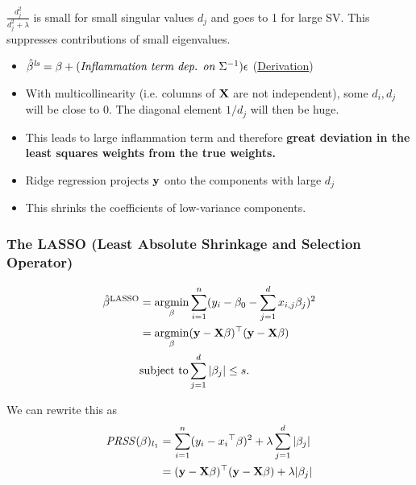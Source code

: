 $\frac{d_j^2}{d_j^2 + \lambda}$ is small for small singular values $d_j$ and goes to 1 for large SV. This suppresses contributions of small eigenvalues.
\begin{itemize}
	\item $\hat \beta^\textit{ls} = \beta + (\textit{Inflammation term dep. on ${\Sigma}^{-1}$}) \epsilon$ (\href{https://kunyu-he.com/2020/01/11/SVD-in-Machine-Learning-Ridge-Regression-and-Multicollinearity/}{Derivation})
	\item With multicollinearity (i.e. columns of $\mathbf X$ are not independent), some $d_i, d_j$ will be close to 0. The diagonal element $1/d_j$ will then be huge. 
	\item This leads to large inflammation term and therefore \textbf{great deviation in the least squares weights from the true weights.}
	\item Ridge regression projects $\mathbf y$ onto the components with large $d_j$
	\item This shrinks the coefficients of low-variance components.
\end{itemize}

\subsubsection{The LASSO (Least Absolute Shrinkage and Selection Operator)}
\begin{align*}
	\hat\beta^{\text{LASSO}}  	&= \mathop{\mathrm{argmin}}_\beta \sum_{i = 1}^{n}(y_i- \beta_0 - \sum_{j = 1}^{d} x_{i,j}\beta_j)^2 \\
								&= \mathop{\mathrm{argmin}}_\beta (\mathbf y - \mathbf X\beta)^\top(\mathbf y-\mathbf X\beta)\\
	&\text{subject to} \sum_{j = 1}^{d}|\beta_j| \leq s.
\end{align*}

We can rewrite this as
\begin{align*}
	\mathit{PRSS}(\beta)_{l_1} 	&= \sum_{i = 1}^{n}(y_i - {x_i}^\top\beta)^2 + \lambda\sum_{j = 1}^{d} |\beta_j| \\
								&= (\mathbf y - \mathbf X\beta)^\top(\mathbf y - \mathbf X\beta) + \lambda|\beta_j|
\end{align*}


